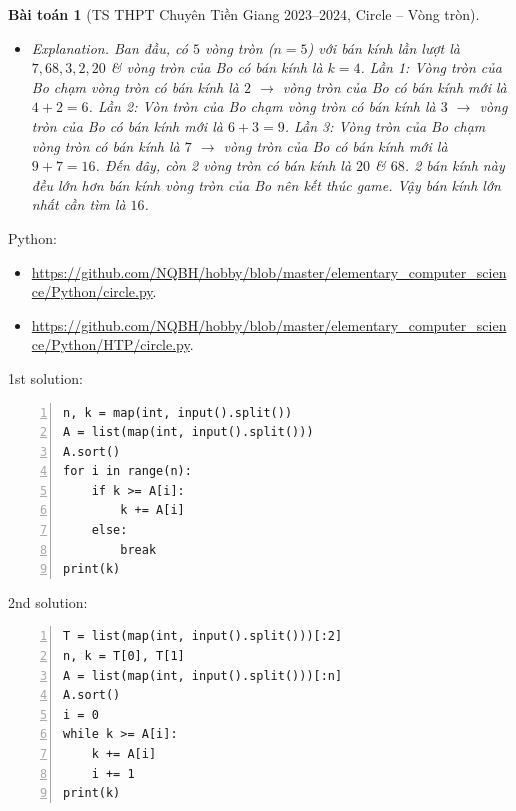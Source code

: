 \documentclass{article}
\newtheorem{baitoan}{Bài toán}
\begin{document}
\begin{baitoan}[TS THPT Chuyên Tiền Giang 2023--2024, Circle -- Vòng tròn]
\begin{itemize}
		\item {\sf Explanation.} Ban đầu, có $5$ vòng tròn ($n = 5$) với bán kính lần lượt là $7,68,3,2,20$ \& vòng tròn của Bo có bán kính là $k = 4$. Lần 1: Vòng tròn của Bo chạm vòng tròn có bán kính là $2$ $\to$ vòng tròn của Bo có bán kính mới là $4 + 2 = 6$. Lần 2: Vòn tròn của Bo chạm vòng tròn có bán kính là $3$ $\to$ vòng tròn của Bo có bán kính mới là $6 + 3 = 9$. Lần 3: Vòng tròn của Bo chạm vòng tròn có bán kính là $7$ $\to$ vòng tròn của Bo có bán kính mới là $9 + 7 = 16$. Đến đây, còn 2 vòng tròn có bán kính là $20$ \& $68$. 2 bán kính này đều lớn hơn bán kính vòng tròn của Bo nên kết thúc game. Vậy bán kính lớn nhất cần tìm là $16$.
	\end{itemize}
\end{baitoan}
Python:
\begin{itemize}
	\item \url{https://github.com/NQBH/hobby/blob/master/elementary_computer_science/Python/circle.py}.
	\item \url{https://github.com/NQBH/hobby/blob/master/elementary_computer_science/Python/HTP/circle.py}.
\end{itemize}

\begin{multicols}{2}
1st solution:
\begin{Verbatim}[numbers=left,xleftmargin=5mm]
n, k = map(int, input().split())
A = list(map(int, input().split()))
A.sort()
for i in range(n):
    if k >= A[i]:
        k += A[i]
    else:
        break
print(k)
\end{Verbatim}
\columnbreak
2nd solution:
\begin{Verbatim}[numbers=left,xleftmargin=5mm]
T = list(map(int, input().split()))[:2]
n, k = T[0], T[1]
A = list(map(int, input().split()))[:n]
A.sort()
i = 0
while k >= A[i]:
    k += A[i]
    i += 1
print(k)
\end{Verbatim}
\end{multicols}
\end{document}
